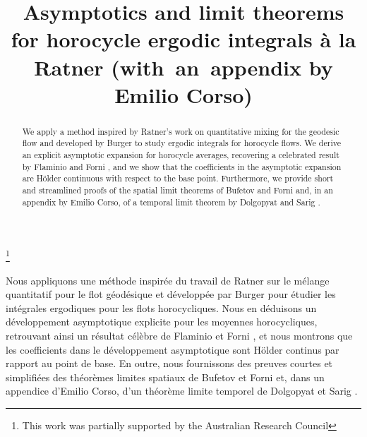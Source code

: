 \documentclass[JEP,XML,SOM,NoEqCountersInSection,Unicode,published]{cedram}
\theoremstyle{definition}
\begin{document}
\frontmatter

\title[Asymptotics and limit theorems for horocycle integrals]
{Asymptotics and limit theorems for horocycle ergodic integrals à la Ratner (with~an~appendix by Emilio Corso)}

\author[\initial{D.} \lastname{Ravotti}]{ }
\address{Monash University, School of Mathematics
\\ Clayton Campus, 3800 Victoria, Australia}

\thanks{This work was partially supported by the Australian Research Council}

\begin{abstract}
We apply a method inspired by Ratner's work on quantitative mixing for the \hbox{geodesic} flow \cite{Rat1} and developed by Burger \cite{Bur} to study ergodic integrals for horocycle flows. We derive an explicit asymptotic expansion for horocycle averages, recovering a celebrated result by Flaminio and Forni \cite{FlaFo}, and we show that the coefficients in the asymptotic expansion are Hölder continuous with respect to the base point. Furthermore, we provide short and streamlined proofs of the spatial limit theorems of Bufetov and Forni \cite{BuFo} and, in an appendix by Emilio Corso, of a temporal limit theorem by Dolgopyat and Sarig \cite{Dolgopyat-Sarig}.
\end{abstract}





\begin{altabstract}
Nous appliquons une méthode inspirée du travail de Ratner sur le mélange quantitatif pour le flot géodésique \cite{Rat1} et développée par Burger \cite{Bur} pour étudier les intégrales ergodiques pour les flots horocycliques. Nous en déduisons un développement asymptotique explicite pour les moyennes horocycliques, retrouvant ainsi un résultat célèbre de Flaminio et Forni \cite{FlaFo}, et nous montrons que les coefficients dans le développement asymptotique sont Hölder continus par rapport au point de base. En outre, nous fournissons des preuves courtes et simplifiées des théorèmes limites spatiaux de Bufetov et Forni \cite{BuFo} et, dans un appendice d'Emilio Corso, d'un théorème limite temporel de Dolgopyat et Sarig \cite{Dolgopyat-Sarig}.
\end{altabstract}
\end{document}

